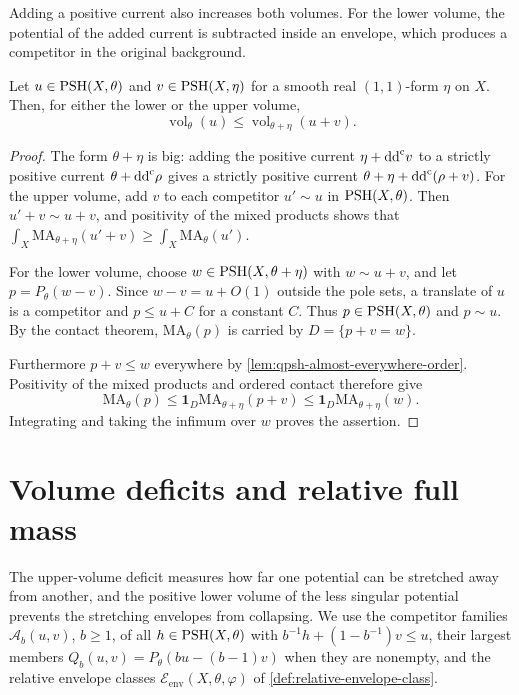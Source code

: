 Adding a positive current also increases both volumes. For the lower volume, the potential of the added current is subtracted inside an envelope, which produces a competitor in the original background.

\begin{proposition}\label{prop:volume-addition}
Let $u\in\mathrm{PSH}(X,\theta)$ and $v\in\mathrm{PSH}(X,\eta)$ for a smooth real $(1,1)$-form $\eta$ on $X$. Then, for either the lower or the upper volume,
\[
 \operatorname{vol}_\theta(u)
 \leq\operatorname{vol}_{\theta+\eta}(u+v).
\]
\end{proposition}
\begin{proof}
The form $\theta+\eta$ is big: adding the positive current $\eta+\mathrm{dd}^{\mathrm{c}} v$ to a strictly positive current $\theta+\mathrm{dd}^{\mathrm{c}}\rho$ gives a strictly positive current $\theta+\eta+\mathrm{dd}^{\mathrm{c}}(\rho+v)$. For the upper volume, add $v$ to each competitor $u'\sim u$ in $\mathrm{PSH}(X,\theta)$. Then $u'+v\sim u+v$, and positivity of the mixed products shows that $\int_X\mathrm{MA}_{\theta+\eta}(u'+v)\geq\int_X\mathrm{MA}_\theta(u')$.

For the lower volume, choose $w\in\mathrm{PSH}(X,\theta+\eta)$ with $w\sim u+v$, and let $p=P_\theta(w-v)$. Since $w-v=u+O(1)$ outside the pole sets, a translate of $u$ is a competitor and $p\leq u+C$ for a constant $C$. Thus $p\in\mathrm{PSH}(X,\theta)$ and $p\sim u$. By the contact theorem, $\mathrm{MA}_\theta(p)$ is carried by $D=\{p+v=w\}$.

Furthermore $p+v\leq w$ everywhere by \cref{lem:qpsh-almost-everywhere-order}. Positivity of the mixed products and ordered contact therefore give
\[
 \mathrm{MA}_\theta(p)
 \leq\mathbf1_D\mathrm{MA}_{\theta+\eta}(p+v)
 \leq\mathbf1_D\mathrm{MA}_{\theta+\eta}(w).
\]
Integrating and taking the infimum over $w$ proves the assertion.
\end{proof}

\section{Volume deficits and relative full mass}

The upper-volume deficit measures how far one potential can be stretched away from another, and the positive lower volume of the less singular potential prevents the stretching envelopes from collapsing. We use the competitor families $\mathcal A_b(u,v)$, $b\geq1$, of all $h\in\mathrm{PSH}(X,\theta)$ with $b^{-1}h+(1-b^{-1})v\leq u$, their largest members $Q_b(u,v)=P_\theta(bu-(b-1)v)$ when they are nonempty, and the relative envelope classes $\mathcal E_{\mathrm{env}}(X,\theta,\varphi)$ of \cref{def:relative-envelope-class}.

